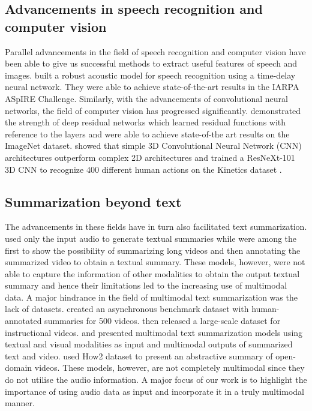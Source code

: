 \documentclass[11pt,a4paper]{article}
\begin{document}
\subsection{Advancements in speech recognition and computer vision}
Parallel advancements in the field of speech recognition and computer vision have been able to give us successful methods to extract useful features of speech and images. \citet{peddinti2015jhu} built a robust acoustic model for speech recognition using a time-delay neural network. They were able to achieve state-of-the-art results in the IARPA ASpIRE Challenge. Similarly, with the advancements of convolutional neural networks, the field of computer vision has progressed significantly. \citet{he2016deep} demonstrated the strength of deep residual networks which learned residual functions with reference to the layers and were able to achieve state-of-the art results on the ImageNet dataset. \citet{hara2018can} showed that simple 3D Convolutional Neural Network (CNN) architectures outperform complex 2D architectures and trained a ResNeXt-101 3D CNN to recognize 400 different human actions on the Kinetics dataset \cite{kay2017kinetics}.

\subsection{Summarization beyond text}
The advancements in these fields have in turn also facilitated text summarization. \citet{rott2016speech} used only the input audio to generate textual summaries while \citet{sah2017semantic} were among the first to show the possibility of summarizing long videos and then annotating the summarized video to obtain a textual summary. These models, however, were not able to capture the information of other modalities to obtain the output textual summary and hence their limitations led to the increasing use of multimodal data. A major hindrance in the field of multimodal text summarization was the lack of datasets. \citet{li2017multi} created an asynchronous benchmark dataset with human-annotated summaries for 500 videos. \citet{sanabria2018how2} then released a large-scale dataset for instructional videos. \citet{jn2020multimodal} and \citet{zhu2018msmo} presented multimodal text summarization models using textual and visual modalities as input and multimodal outputs of summarized text and video. \citet{palaskar2019multimodal} used How2 dataset to present an abstractive summary of open-domain videos. These models, however, are not completely multimodal since they do not utilise the audio information. A major focus of our work is to highlight the importance of using audio data as input and incorporate it in a truly multimodal manner.
\end{document}
